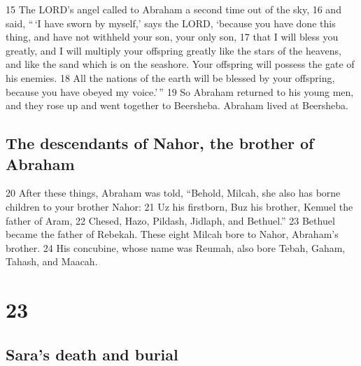 {15} The LORD's angel called to Abraham a second time out of the sky,
{16} and said, ``\,`I have sworn by myself,' says the LORD, `because you
have done this thing, and have not withheld your son, your only son,
{17} that I will bless you greatly, and I will multiply your offspring
greatly like the stars of the heavens, and like the sand which is on the
seashore. Your offspring will possess the gate of his enemies. {18} All
the nations of the earth will be blessed by your offspring, because you
have obeyed my voice.'\,'' {19} So Abraham returned to his young men,
and they rose up and went together to Beersheba. Abraham lived at
Beersheba.

\hypertarget{the-descendants-of-nahor-the-brother-of-abraham}{%
\subsection{The descendants of Nahor, the brother of
Abraham}\label{the-descendants-of-nahor-the-brother-of-abraham}}

{20} After these things, Abraham was told, ``Behold, Milcah, she also
has borne children to your brother Nahor: {21} Uz his firstborn, Buz his
brother, Kemuel the father of Aram, {22} Chesed, Hazo, Pildash, Jidlaph,
and Bethuel.'' {23} Bethuel became the father of Rebekah. These eight
Milcah bore to Nahor, Abraham's brother. {24} His concubine, whose name
was Reumah, also bore Tebah, Gaham, Tahash, and Maacah.

\hypertarget{section-22}{%
\section{23}\label{section-22}}

\hypertarget{saras-death-and-burial}{%
\subsection{Sara's death and burial}\label{saras-death-and-burial}}

